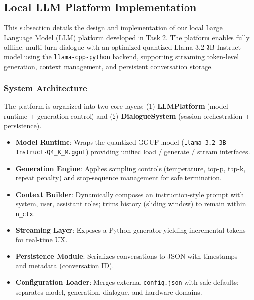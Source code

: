 \documentclass[12pt,a4paper]{article}
\begin{document}
\subsection{Local LLM Platform Implementation}

This subsection details the design and implementation of our local Large Language Model (LLM) platform developed in Task 2. The platform enables fully offline, multi-turn dialogue with an optimized quantized Llama 3.2 3B Instruct model using the \texttt{llama-cpp-python} backend, supporting streaming token-level generation, context management, and persistent conversation storage.

\subsubsection*{System Architecture}

The platform is organized into two core layers: (1) \textbf{LLMPlatform} (model runtime + generation control) and (2) \textbf{DialogueSystem} (session orchestration + persistence). 

\begin{itemize}[leftmargin=1.2em]
    \item \textbf{Model Runtime}: Wraps the quantized GGUF model (\texttt{Llama-3.2-3B-Instruct-Q4\_K\_M.gguf}) providing unified load / generate / stream interfaces.  
    \item \textbf{Generation Engine}: Applies sampling controls (temperature, top-p, top-k, repeat penalty) and stop-sequence management for safe termination.  
    \item \textbf{Context Builder}: Dynamically composes an instruction-style prompt with system, user, assistant roles; trims history (sliding window) to remain within \texttt{n\_ctx}.  
    \item \textbf{Streaming Layer}: Exposes a Python generator yielding incremental tokens for real-time UX.  
    \item \textbf{Persistence Module}: Serializes conversations to JSON with timestamps and metadata (conversation ID).  
    \item \textbf{Configuration Loader}: Merges external \texttt{config.json} with safe defaults; separates model, generation, dialogue, and hardware domains.  
\end{itemize}
\end{document}
